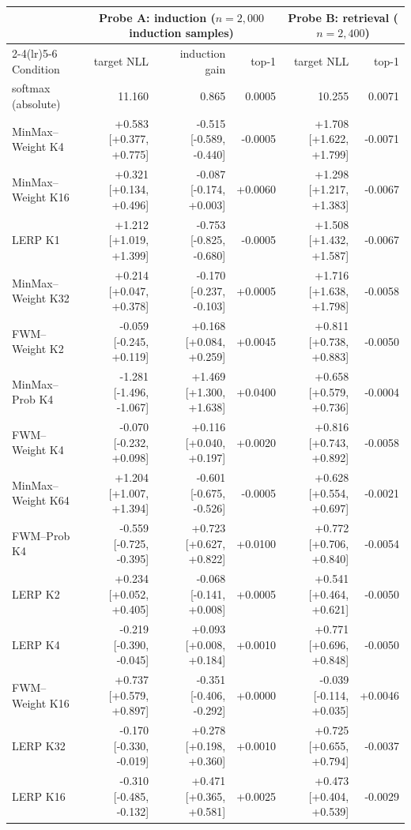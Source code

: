 \begin{tabular}{lrrrrr}
\toprule
 & \multicolumn{3}{c}{Probe A: induction ($n{=}2{,}000$ induction samples)} & \multicolumn{2}{c}{Probe B: retrieval ($n{=}2{,}400$)} \\
\cmidrule(lr){2-4}\cmidrule(lr){5-6}
Condition & target NLL & induction gain & top-1 & target NLL & top-1 \\
\midrule
softmax (absolute) & 11.160 & 0.865 & 0.0005 & 10.255 & 0.0071 \\
\midrule
MinMax--Weight K4 & +0.583 [+0.377, +0.775] & -0.515 [-0.589, -0.440] & -0.0005 & +1.708 [+1.622, +1.799] & -0.0071 \\
MinMax--Weight K16 & +0.321 [+0.134, +0.496] & -0.087 [-0.174, +0.003] & +0.0060 & +1.298 [+1.217, +1.383] & -0.0067 \\
LERP K1 & +1.212 [+1.019, +1.399] & -0.753 [-0.825, -0.680] & -0.0005 & +1.508 [+1.432, +1.587] & -0.0067 \\
MinMax--Weight K32 & +0.214 [+0.047, +0.378] & -0.170 [-0.237, -0.103] & +0.0005 & +1.716 [+1.638, +1.798] & -0.0058 \\
FWM--Weight K2 & -0.059 [-0.245, +0.119] & +0.168 [+0.084, +0.259] & +0.0045 & +0.811 [+0.738, +0.883] & -0.0050 \\
MinMax--Prob K4 & -1.281 [-1.496, -1.067] & +1.469 [+1.300, +1.638] & +0.0400 & +0.658 [+0.579, +0.736] & -0.0004 \\
FWM--Weight K4 & -0.070 [-0.232, +0.098] & +0.116 [+0.040, +0.197] & +0.0020 & +0.816 [+0.743, +0.892] & -0.0058 \\
MinMax--Weight K64 & +1.204 [+1.007, +1.394] & -0.601 [-0.675, -0.526] & -0.0005 & +0.628 [+0.554, +0.697] & -0.0021 \\
FWM--Prob K4 & -0.559 [-0.725, -0.395] & +0.723 [+0.627, +0.822] & +0.0100 & +0.772 [+0.706, +0.840] & -0.0054 \\
LERP K2 & +0.234 [+0.052, +0.405] & -0.068 [-0.141, +0.008] & +0.0005 & +0.541 [+0.464, +0.621] & -0.0050 \\
LERP K4 & -0.219 [-0.390, -0.045] & +0.093 [+0.008, +0.184] & +0.0010 & +0.771 [+0.696, +0.848] & -0.0050 \\
FWM--Weight K16 & +0.737 [+0.579, +0.897] & -0.351 [-0.406, -0.292] & +0.0000 & -0.039 [-0.114, +0.035] & +0.0046 \\
LERP K32 & -0.170 [-0.330, -0.019] & +0.278 [+0.198, +0.360] & +0.0010 & +0.725 [+0.655, +0.794] & -0.0037 \\
LERP K16 & -0.310 [-0.485, -0.132] & +0.471 [+0.365, +0.581] & +0.0025 & +0.473 [+0.404, +0.539] & -0.0029 \\
\bottomrule
\end{tabular}
